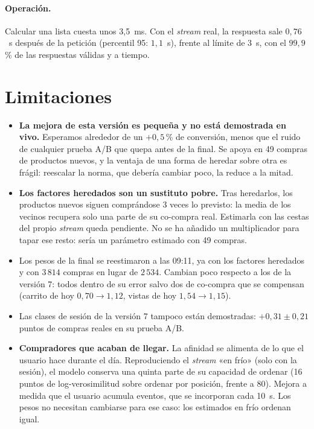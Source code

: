 \documentclass[11pt,a4paper]{article}
\begin{document}
\paragraph{Operación.} Calcular una lista cuesta unos 3{,}5~ms. Con el \emph{stream} real, la respuesta
sale $0{,}76$~s después de la petición (percentil 95: $1{,}1$~s), frente al límite de 3~s, con el
$99{,}9$\,\% de las respuestas válidas y a tiempo.

\section{Limitaciones}

\begin{itemize}\setlength{\itemsep}{0.15em}
\item \textbf{La mejora de esta versión es pequeña y no está demostrada en vivo.} Esperamos alrededor de
un $+0{,}5$\,\% de conversión, menos que el ruido de cualquier prueba A/B que quepa antes de la final. Se
apoya en 49 compras de productos nuevos, y la ventaja de una forma de heredar sobre otra es frágil:
reescalar la norma, que debería cambiar poco, la reduce a la mitad.
\item \textbf{Los factores heredados son un sustituto pobre.} Tras heredarlos, los productos nuevos
siguen comprándose 3 veces lo previsto: la media de los vecinos recupera solo una parte de su co-compra
real. Estimarla con las cestas del propio \emph{stream} queda pendiente. No se ha añadido un multiplicador
para tapar ese resto: sería un parámetro estimado con 49 compras.
\item Los pesos de la final se reestimaron a las 09:11, ya con los factores heredados y con $3\,814$ compras
en lugar de $2\,534$. Cambian poco respecto a los de la versión 7: todos dentro de su error salvo dos de
co-compra que se compensan (carrito de hoy $0{,}70\to1{,}12$, vistas de hoy $1{,}54\to1{,}15$).
\item Las clases de sesión de la versión 7 tampoco están demostradas: $+0{,}31\pm0{,}21$ puntos de compras
reales en su prueba A/B.
\item \textbf{Compradores que acaban de llegar.} La afinidad se alimenta de lo que el usuario hace durante
el día. Reproduciendo el \emph{stream} «en frío» (solo con la sesión), el modelo conserva una quinta parte
de su capacidad de ordenar (16 puntos de log-verosimilitud sobre ordenar por posición, frente a 80).
Mejora a medida que el usuario acumula eventos, que se incorporan cada 10~s. Los pesos no necesitan
cambiarse para ese caso: los estimados en frío ordenan igual.

\end{itemize}
\end{document}
